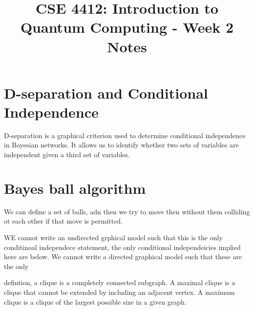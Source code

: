\documentclass[11pt]{article}
\title{CSE 4412: Introduction to Quantum Computing - Week 2 Notes}
\author{}
\date{}
\begin{document}
\maketitle
\section*{D-separation and Conditional Independence}
D-separation is a graphical criterion used to determine conditional independence in Bayesian networks. It allows us to identify whether two sets of variables are independent given a third set of variables.
\section*{Bayes ball algorithm}
We can define a set of balls, adn then we try to move then without them colliding ot each other if that move is permitted.

WE cannot write an undirected grphical model such that this is the only conditinoal independece statement, the only conditional independeicies implied here are below. We cannot write a directed graphical model such that these are the only 

defintion, a clique is a completely connected subgraph. A maximal clique is a clique that cannot be extended by including an adjacent vertex. A maximum clique is a clique of the largest possible size in a given graph.
\end{document}

